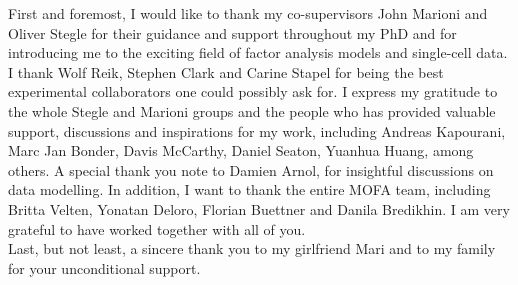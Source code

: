 
\begin{acknowledgements}


First and foremost, I would like to thank my co-supervisors John Marioni and Oliver Stegle for their guidance and support throughout my PhD and for introducing me to the exciting field of factor analysis models and single-cell data. I thank Wolf Reik, Stephen Clark and Carine Stapel for being the best experimental collaborators one could possibly ask for. I express my gratitude to the whole Stegle and Marioni groups and the people who has provided valuable support, discussions and inspirations for my work, including Andreas Kapourani, Marc Jan Bonder, Davis McCarthy, Daniel Seaton, Yuanhua Huang, among others. A special thank you note to Damien Arnol, for insightful discussions on data modelling. In addition, I want to thank the entire MOFA team, including Britta Velten, Yonatan Deloro, Florian Buettner and Danila Bredikhin. I am very grateful to have worked together with all of you.\\
Last, but not least, a sincere thank you to my girlfriend Mari and to my family for your unconditional support.

\end{acknowledgements}
